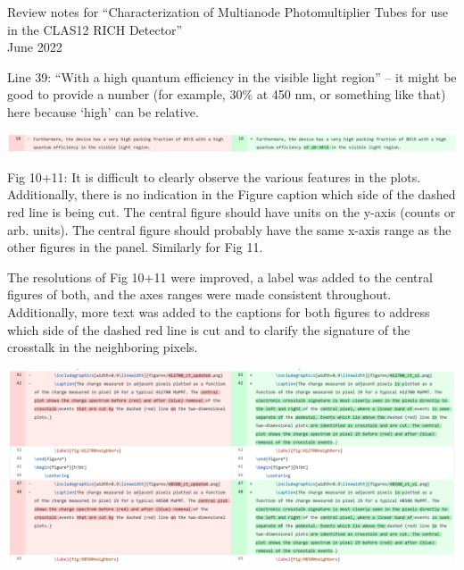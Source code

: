 \documentclass[11pt]{report}
\begin{document}
 

{\LARGE\centering
Review notes for “Characterization of Multianode Photomultiplier Tubes for use in the CLAS12 RICH Detector”\\[1cm]

June 2022\\[1cm]
}

\begin{tcolorbox}[enlarge top by=2em,colbacktitle=black!60!white,colframe=black!80!white,left=0pt,right=0pt,top=0pt,bottom=0pt,boxrule=0.3pt,title=\bfseries1.01]
Line 39: “With a high quantum efficiency in the visible light region” – it might be good to provide a number (for example, 30\% at 450 nm, or something like that) here because ‘high’ can be relative.
\end{tcolorbox}


\includegraphics[width=\linewidth]{round1/1.01.png}

\begin{tcolorbox}[enlarge top by=2em,colbacktitle=red!60!white,colframe=black!80!white,left=0pt,right=0pt,top=0pt,bottom=0pt,boxrule=0.3pt,title=\bfseries1.02]
Fig  10+11:  It  is  difficult  to  clearly  observe  the  various  features  in  the  plots.   Additionally,  there  is no indication in the Figure caption which side of the dashed red line is being cut.  The central figure should have units on the y-axis (counts or arb.  units).  The central figure should probably have the same x-axis range as the other figures in the panel.  Similarly for Fig 11.
\end{tcolorbox}

The resolutions of Fig 10+11 were improved, a label was added to the central figures of both, and the axes ranges were made consistent throughout. Additionally, more text was added to the captions for both figures to address which side of the dashed red line is cut and to clarify the signature of the crosstalk in the neighboring pixels.


\includegraphics[width=\linewidth]{round1/1.02.png}
\end{document}

